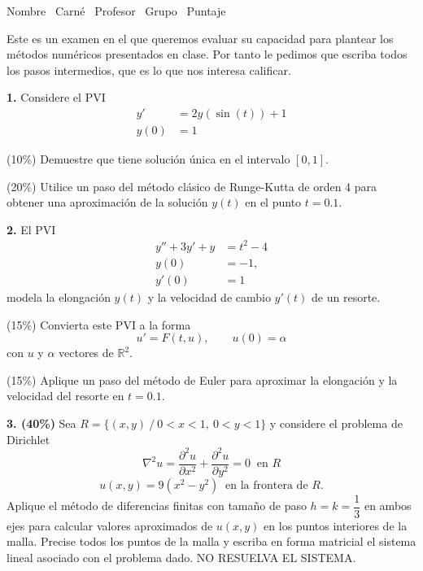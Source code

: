 \documentclass[11pt]{article}
\begin{document}
\examheader

\vspace{6pt}
\noindent Nombre \dotfill\ Carné \dotfill\ Profesor \dotfill\ Grupo \dotfill\ Puntaje \dotfill

\vspace{8pt}
\noindent Este es un examen en el que queremos evaluar su capacidad para plantear los métodos numéricos presentados en clase. Por tanto le pedimos que escriba todos los pasos intermedios, que es lo que nos interesa calificar.

\vspace{10pt}
\noindent\textbf{1.} Considere el PVI
\[
\begin{aligned} y'&=2y(\sin(t))+1\\ y(0)&=1 \end{aligned}
\]
\begin{opciones}
\item (10\%) Demuestre que tiene solución única en el intervalo $[0,1]$.
\item (20\%) Utilice un paso del método clásico de Runge-Kutta de orden 4 para obtener una aproximación de la solución $y(t)$ en el punto $t=0.1$.
\end{opciones}

\vspace{5mm}
\noindent\textbf{2.} El PVI
\[
\begin{aligned} y''+3y'+y&=t^2-4\\ y(0)&=-1,\\ y'(0)&=1 \end{aligned}
\]
modela la elongación $y(t)$ y la velocidad de cambio $y'(t)$ de un resorte.
\begin{opciones}
\item (15\%) Convierta este PVI a la forma
\[
u'=F(t,u), \qquad u(0)=\alpha
\]
con $u$ y $\alpha$ vectores de $\mathbb{R}^2$.
\item (15\%) Aplique un paso del método de Euler para aproximar la elongación y la velocidad del resorte en $t=0.1$.
\end{opciones}

\vspace{5mm}
\noindent\textbf{3. (40\%)} Sea $R=\{(x,y)\ /\ 0<x<1,\ 0<y<1\}$ y considere el problema de Dirichlet
\[
\nabla^2 u=\frac{\partial^2 u}{\partial x^2}+\frac{\partial^2 u}{\partial y^2}=0 \ \text{ en } R
\]
\[
u(x,y)=9(x^2-y^2) \ \text{ en la frontera de } R.
\]
Aplique el método de diferencias finitas con tamaño de paso $h=k=\dfrac13$ en ambos ejes para calcular valores aproximados de $u(x,y)$ en los puntos interiores de la malla. Precise todos los puntos de la malla y escriba en forma matricial el sistema lineal asociado con el problema dado. NO RESUELVA EL SISTEMA.
\end{document}
